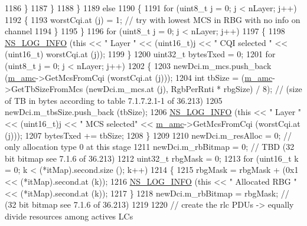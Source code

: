\begin{DoxyCode}
1186                 \}
1187             \}
1188         \}
1189       \textcolor{keywordflow}{else}
1190         \{
1191           \textcolor{keywordflow}{for} (uint8\_t j = 0; j < nLayer; j++)
1192             \{
1193               worstCqi.at (j) = 1; \textcolor{comment}{// try with lowest MCS in RBG with no info on channel}
1194             \}
1195         \}
1196       \textcolor{keywordflow}{for} (uint8\_t j = 0; j < nLayer; j++)
1197         \{
1198           \hyperlink{group__logging_gafbd73ee2cf9f26b319f49086d8e860fb}{NS\_LOG\_INFO} (\textcolor{keyword}{this} << \textcolor{stringliteral}{" Layer "} << (uint16\_t)j << \textcolor{stringliteral}{" CQI selected "} << (uint16\_t)
      worstCqi.at (j));
1199         \}
1200       uint32\_t bytesTxed = 0;
1201       \textcolor{keywordflow}{for} (uint8\_t j = 0; j < nLayer; j++)
1202         \{
1203           newDci.m\_mcs.push\_back (\hyperlink{classns3_1_1FdMtFfMacScheduler_a243eae6fea006597039d90bc727786eb}{m\_amc}->GetMcsFromCqi (worstCqi.at (j)));
1204           \textcolor{keywordtype}{int} tbSize = (\hyperlink{classns3_1_1FdMtFfMacScheduler_a243eae6fea006597039d90bc727786eb}{m\_amc}->GetTbSizeFromMcs (newDci.m\_mcs.at (j), RgbPerRnti * rbgSize) / 8); \textcolor{comment}{//
       (size of TB in bytes according to table 7.1.7.2.1-1 of 36.213)}
1205           newDci.m\_tbsSize.push\_back (tbSize);
1206           \hyperlink{group__logging_gafbd73ee2cf9f26b319f49086d8e860fb}{NS\_LOG\_INFO} (\textcolor{keyword}{this} << \textcolor{stringliteral}{" Layer "} << (uint16\_t)j << \textcolor{stringliteral}{" MCS selected"} << 
      \hyperlink{classns3_1_1FdMtFfMacScheduler_a243eae6fea006597039d90bc727786eb}{m\_amc}->GetMcsFromCqi (worstCqi.at (j)));
1207           bytesTxed += tbSize;
1208         \}
1209 
1210       newDci.m\_resAlloc = 0;  \textcolor{comment}{// only allocation type 0 at this stage}
1211       newDci.m\_rbBitmap = 0; \textcolor{comment}{// TBD (32 bit bitmap see 7.1.6 of 36.213)}
1212       uint32\_t rbgMask = 0;
1213       \textcolor{keywordflow}{for} (uint16\_t k = 0; k < (*itMap).second.size (); k++)
1214         \{
1215           rbgMask = rbgMask + (0x1 << (*itMap).second.at (k));
1216           \hyperlink{group__logging_gafbd73ee2cf9f26b319f49086d8e860fb}{NS\_LOG\_INFO} (\textcolor{keyword}{this} << \textcolor{stringliteral}{" Allocated RBG "} << (*itMap).second.at (k));
1217         \}
1218       newDci.m\_rbBitmap = rbgMask; \textcolor{comment}{// (32 bit bitmap see 7.1.6 of 36.213)}
1219 
1220       \textcolor{comment}{// create the rlc PDUs -> equally divide resources among actives LCs}

\end{DoxyCode}
